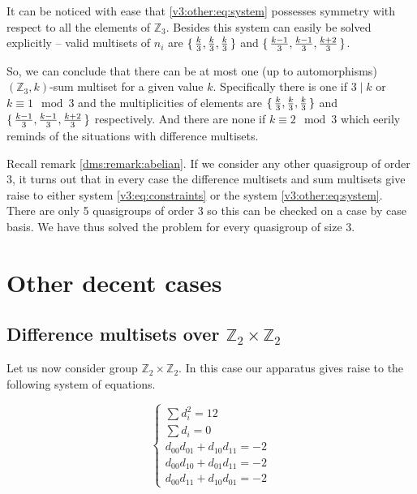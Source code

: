     It can be noticed with ease that \eqref{v3:other:eq:system} possesses symmetry with respect to all the elements of $\mathbb Z_3$. Besides this system can easily be solved explicitly -- valid multisets of $n_i$ are $\set{\frac k 3, \frac k 3, \frac k 3}$ and $\set{\frac{k-1}{3}, \frac{k-1}{3}, \frac{k+2}{3}}$.
    
    So, we can conclude that there can be at most one (up to automorphisms) $(\mathbb Z_3, k)$-sum multiset for a given value $k$. Specifically there is one if $3 \mid k$ or $k \equiv 1 \mod 3$ and the multiplicities of elements are $\set{\frac k 3, \frac k 3, \frac k 3}$ and $\set{\frac{k-1}{3}, \frac{k-1}{3}, \frac{k+2}{3}}$ respectively. And there are none if $k \equiv 2 \mod 3$ which eerily reminds of the situations with difference multisets.
    
    Recall remark \ref{dms:remark:abelian}. If we consider any other quasigroup of order 3, it turns out that in every case the difference multisets and sum multisets give raise to either system \eqref{v3:eq:constraints} or the system \eqref{v3:other:eq:system}. There are only 5 quasigroups of order 3 so this can be checked on a case by case basis. We have thus solved the problem for every quasigroup of size 3.

\section{Other decent cases}
\subsection{Difference multisets over $\mathbb Z_2 \times \mathbb Z_2$}
    Let us now consider group $\mathbb Z_2 \times \mathbb Z_2$. In this case our apparatus gives raise to the following system of equations.
    
    \begin{equation}
        \label{v4:eq:constraints}
        \begin{cases}
            \sum d_i^2 = 12 \\
            \sum d_i = 0 \\
            d_{00} d_{01} + d_{10} d_{11} = -2 \\
            d_{00} d_{10} + d_{01} d_{11} = -2 \\
            d_{00} d_{11} + d_{10} d_{01} = -2
        \end{cases}
    \end{equation}
    
